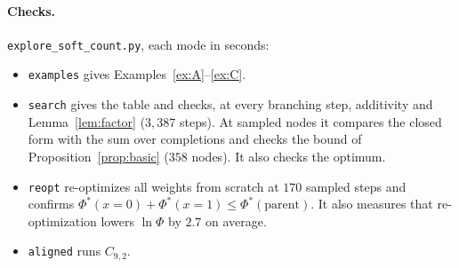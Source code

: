 \documentclass[11pt,a4paper]{article}
\theoremstyle{definition}
\begin{document}
\paragraph{Checks.} \texttt{explore\_soft\_count.py}, each mode in seconds:
\begin{itemize}
 \item \texttt{examples} gives Examples~\ref{ex:A}--\ref{ex:C}.
 \item \texttt{search} gives the table and checks, at every branching step,
 additivity and Lemma~\ref{lem:factor} ($3{,}387$ steps). At sampled nodes it
 compares the closed form with the sum over completions and checks the bound
 of Proposition~\ref{prop:basic} ($358$ nodes). It also checks the optimum.
 \item \texttt{reopt} re-optimizes all weights from scratch at $170$ sampled
 steps and confirms
 $\Phi^*(x=0)+\Phi^*(x=1)\le\Phi^*(\text{parent})$. It also measures that
 re-optimization lowers $\ln\Phi$ by $2.7$ on average.
 \item \texttt{aligned} runs $C_{9,2}$.
\end{itemize}
\end{document}

